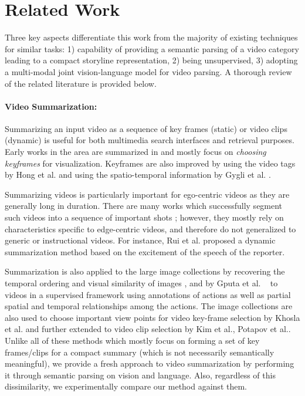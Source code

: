 \section{Related Work}
Three key aspects differentiate this work from the majority of existing techniques for similar tasks: 1) capability of providing a semantic parsing of a video category leading to a compact storyline representation, 2) being unsupervised, 3) adopting a multi-modal joint vision-language model for video parsing. A thorough review of the related literature is provided below.

\paragraph{Video Summarization:}
Summarizing an input video as a sequence of key frames (static) or video clips (dynamic) is useful for both multimedia search interfaces and retrieval purposes. Early works in the area are summarized in \cite{vidAbstraction} and mostly focus on \emph{choosing keyframes} for visualization. Keyframes are also improved by using the video tags by Hong et al. \cite{beyondSearch} and using the spatio-temporal information by Gygli et al. \cite{createSum}.

Summarizing videos is particularly important for ego-centric videos as they are generally long in duration. There are many works which successfully segment such videos into a sequence of important shots \cite{lee2012discovering, lu2013story}; however, they mostly rely on characteristics specific to edge-centric videos, and therefore do not generalized to generic or instructional videos. For instance, Rui et al. \cite{rui2000automatically} proposed a dynamic summarization method based on the excitement of the speech of the reporter.

Summarization is also applied to the large image collections by recovering the temporal ordering and visual similarity of images \cite{storyGraph}, and by Gputa et al. ~\cite{gupta2009understanding} to videos in a supervised framework using annotations of actions as well as partial spatial and temporal relationships among the actions. The image collections are also used to choose important view points for video key-frame selection by Khosla et al.\cite{khosla2013large} and further extended to video clip selection by Kim et al.\cite{kim2014joint}, Potapov et al.\cite{potapov2014category}. Unlike all of these methods which mostly focus on forming a set of key frames/clips for a compact summary (which is not necessarily semantically meaningful), we provide a fresh approach to video summarization by performing it through semantic parsing on vision and language. Also, regardless of this dissimilarity, we experimentally compare our method against them.

